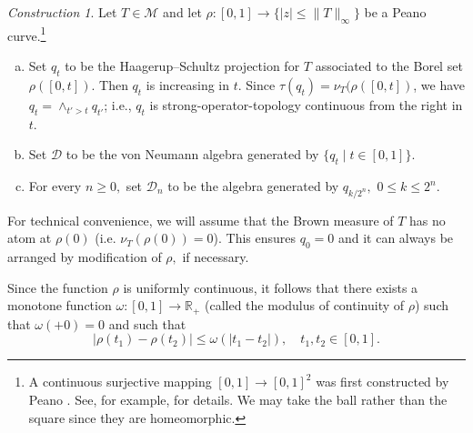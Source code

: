 \documentclass{amsart}
\theoremstyle{plain}
\theoremstyle{remark}
\newtheorem{construct}[thm]{Construction}
\begin{document}
\begin{construct}\label{peano} Let $T\in\mathcal{M}$ and let $\rho:[0,1]\to\{|z|\leq \|T\|_{\infty}\}$ be a Peano curve.\footnote{A continuous surjective mapping $[0,1]\to[0,1]^2$ was first constructed by Peano \cite{Peano}. See, for example, \cite{Man} for details. We may take the ball rather than the square since they are homeomorphic.}
\begin{enumerate}[(a)]
\item Set $q_t$ to be the Haagerup--Schultz projection for $T$ associated to the Borel set $\rho([0,t]).$
Then $q_t$ is increasing in $t$.
Since $\tau(q_t)=\nu_T(\rho([0,t])$, we have $q_t=\wedge_{t'>t}q_{t'}$;
i.e., $q_t$ is strong-operator-topology continuous from the right in $t$.
\item Set $\mathcal{D}$ to be the von Neumann algebra generated by $\{q_t\mid t\in[0,1]\}.$
\item For every $n\geq0,$ set $\mathcal{D}_n$ to be the algebra generated by $q_{k/2^n},$ $0\leq k\leq 2^n.$
\end{enumerate}
For technical convenience, we will assume that the Brown measure of $T$ has no atom at $\rho(0)$ (i.e. $\nu_T(\rho(0))=0$). This ensures $q_0=0$ and it can always be arranged by modification of $\rho,$ if necessary. 
\end{construct}

Since the function $\rho$ is uniformly continuous, it follows that there exists a monotone function $\omega:[0,1]\to\mathbb{R}_+$ (called the modulus of continuity of $\rho$) such that $\omega(+0)=0$ and such that
$$|\rho(t_1)-\rho(t_2)|\leq\omega(|t_1-t_2|),\quad t_1,t_2\in[0,1].$$
\end{document}
